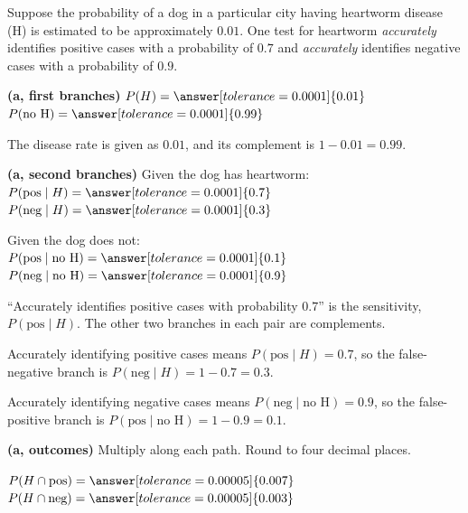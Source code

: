 \documentclass[12pt]{ximera}
\begin{document}
\begin{problem}
Suppose the probability of a dog in a particular city having heartworm disease (H) is
estimated to be approximately $0.01$. One test for heartworm \emph{accurately}
identifies positive cases with a probability of $0.7$ and \emph{accurately} identifies
negative cases with a probability of $0.9$.

\begin{prompt}
\textbf{(a, first branches)} $P(H)=\answer[tolerance=0.0001]{0.01}$ \qquad
$P(\text{no H})=\answer[tolerance=0.0001]{0.99}$

\begin{solution}
The disease rate is given as $0.01$, and its complement is $1-0.01=0.99$.
\end{solution}
\end{prompt}

\begin{prompt}
\textbf{(a, second branches)} Given the dog has heartworm: \\
$P(\text{pos}\mid H)=\answer[tolerance=0.0001]{0.7}$ \qquad
$P(\text{neg}\mid H)=\answer[tolerance=0.0001]{0.3}$

\smallskip
Given the dog does not: \\
$P(\text{pos}\mid \text{no H})=\answer[tolerance=0.0001]{0.1}$ \qquad
$P(\text{neg}\mid \text{no H})=\answer[tolerance=0.0001]{0.9}$

\begin{hint}
``Accurately identifies positive cases with probability $0.7$'' is the sensitivity,
$P(\text{pos}\mid H)$. The other two branches in each pair are complements.
\end{hint}

\begin{solution}
Accurately identifying positive cases means $P(\text{pos}\mid H)=0.7$, so the
false-negative branch is $P(\text{neg}\mid H)=1-0.7=0.3$.

Accurately identifying negative cases means $P(\text{neg}\mid\text{no H})=0.9$, so the
false-positive branch is $P(\text{pos}\mid\text{no H})=1-0.9=0.1$.
\end{solution}
\end{prompt}

\begin{prompt}
\textbf{(a, outcomes)} Multiply along each path. Round to four decimal places.

$P(H\cap\text{pos})=\answer[tolerance=0.00005]{0.007}$ \qquad
$P(H\cap\text{neg})=\answer[tolerance=0.00005]{0.003}$


\end{prompt}
\end{problem}
\end{document}
